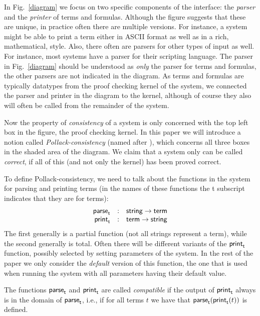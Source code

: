 \documentclass{entcs}
\begin{document}
In Fig.~\ref{diagram} we focus on two specific components of the
interface: the \emph{parser} and the \emph{printer} of terms and formulas.
Although the figure suggests that these are unique,
in practice often there are multiple versions.
For instance, a system might be able to print a term either
in {\small ASCII} format as well as in a rich, mathematical, style.
Also, there often are parsers for other types of input as well.
For instance, most systems have a parser for their scripting
language.
The parser in Fig.~\ref{diagram} should be understood as \emph{only}
the parser for terms and formulas,
the other parsers are not indicated in the diagram.
As terms and formulas are typically datatypes from
the proof checking kernel of the system, we connected the parser
and printer in the diagram to the kernel, although of course
they also will often
be called from the remainder of the system.

Now the property of \emph{consistency} of a system is only concerned with
the top left box in the figure, the proof checking kernel.
In this paper we will introduce a notion called \emph{Pollack-consistency}
(named after \cite{pol:98}), which concerns all three boxes in the
shaded area of the diagram.
We claim that a system only can be called \emph{correct}, if all of this
(and not only the kernel) has been proved correct.

To define Pollack-consistency, we need to talk about the functions in the system
for parsing and printing terms (in the names of these functions the {\sf t} subscript indicates that
they are for terms):
$$
\begin{array}{rcl}
{\sf parse}_{\sf t} &:& {\sf string} \to {\sf term} \\
{\sf print}_{\sf t} &:& {\sf term} \to {\sf string}
\end{array}
$$
The first generally is a partial function (not all strings represent
a term), while the second generally is total.
Often there will be different {variants} of the ${\sf print}_{\sf t}$
function, possibly selected by setting parameters of the system.
In the rest of the paper we only consider the \emph{default} version of this function,
the one that is used when running the system with all parameters
having their default value.

\begin{definition}
\label{compatible}
The functions ${\sf parse}_{\sf t}$ and ${\sf print}_{\sf t}$ are called \emph{compatible} if
the output of ${\sf print}_{\sf t}$ always is in the domain of ${\sf parse}_{\sf t}$, i.e., if for all terms $t$ we have that ${\sf parse}_{\sf t}({\sf print}_{\sf t}(t))$ is defined.
\end{definition}
\end{document}
